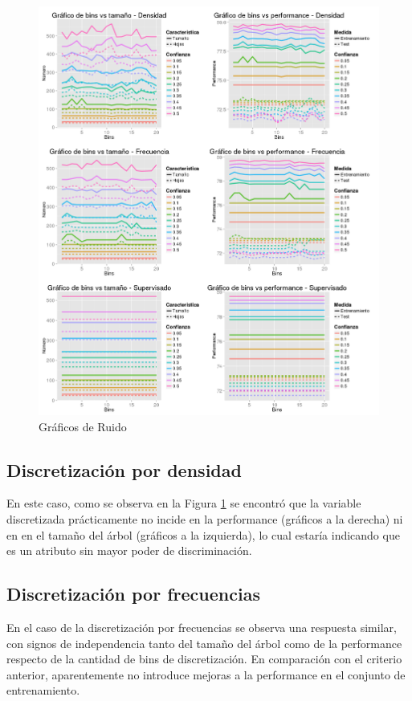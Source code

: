 \documentclass[]{article}
\begin{document}
\begin{figure}[H]
	\includegraphics[scale = 0.38]{4_1_Bins_Todas_var}
	\caption[Ruido]{Gráficos de Ruido}
	\label{4.P4Todas}
\end{figure}


\subsection{Discretización por densidad}
En este caso, como se observa en la Figura \ref{4.P4Todas} se encontró que la variable discretizada prácticamente no incide en la performance (gráficos a la derecha) ni en en el tamaño del árbol (gráficos a la izquierda), lo cual estaría indicando que es un atributo sin mayor poder de discriminación.

\subsection{Discretización por frecuencias}
En el caso de la discretización por frecuencias se observa una respuesta similar, con signos de independencia tanto del tamaño del árbol como de la performance respecto de la cantidad de bins de discretización. En comparación con el criterio anterior, aparentemente no introduce mejoras a la performance en el conjunto de entrenamiento. 
\end{document}
